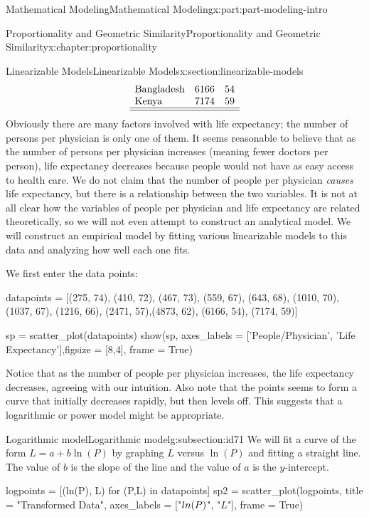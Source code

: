 \documentclass[oneside,10pt,]{book}
\numberwithin{equation}{section}
\begin{document}
\begin{partptx}{Mathematical Modeling}{}{Mathematical Modeling}{}{}{x:part:part-modeling-intro}
\begin{chapterptx}{Proportionality and Geometric Similarity}{}{Proportionality and Geometric Similarity}{}{}{x:chapter:proportionality}
\begin{sectionptx}{Linearizable Models}{}{Linearizable Models}{}{}{x:section:linearizable-models}
\begin{equation*}
\begin{array}{lcc}
\text{Bangladesh} & 6166 & 54 \\
\text{Kenya} & 7174 & 59\\\hline\hline
\end{array}
\end{equation*}
Obviously there are many factors involved with life expectancy; the number of persons per physician is only one of them. It seems reasonable to believe that as the number of persons per physician increases (meaning fewer doctors per person), life expectancy decreases because people would not have as easy access to health care.  We do not claim that the number of people per physician \emph{causes} life expectancy, but there is a relationship between the two variables. It is not at all clear how the variables of people per physician and life expectancy are related theoretically, so we will not even attempt to construct an analytical model. We will construct an empirical model by fitting various linearizable models to this data and analyzing how well each one fits.%
\par
We first enter the data points:%
\begin{sageinput}
datapoints = [(275, 74), (410, 72), (467, 73), (559, 67), 
	(643, 68), (1010, 70), (1037, 67), (1216, 66), 
	(2471, 57),(4873, 62), (6166, 54), (7174, 59)]
\end{sageinput}
\begin{sageinput}
sp = scatter_plot(datapoints)
show(sp, axes_labels = ['People/Physician', 'Life Expectancy'],figsize = [8,4], frame = True)
\end{sageinput}
Notice that as the number of people per physician increases, the life expectancy decreases, agreeing with our intuition. Also note that the points seems to form a curve that initially decreases rapidly, but then levels off. This suggests that a logarithmic or power model might be appropriate.%
%
%
\typeout{************************************************}
\typeout{************************************************}
%
\begin{subsectionptx}{Logarithmic model}{}{Logarithmic model}{}{}{g:subsection:id71}
We will fit a curve of the form \(L = a + b\ln(P)\) by graphing \(L\) versus \(\ln(P)\) and fitting a straight line.  The value of \(b\) is the slope of the line and the value of \(a\) is the \(y\)-intercept.%
\begin{sageinput}
logpoints = [(ln(P), L) for (P,L) in datapoints]
sp2 = scatter_plot(logpoints, title = "Transformed Data", 
	axes_labels = ["$\\ln(P)$", "$L$"], frame = True)

\end{sageinput}
\end{subsectionptx}
\end{sectionptx}
\end{chapterptx}
\end{partptx}
\end{document}
